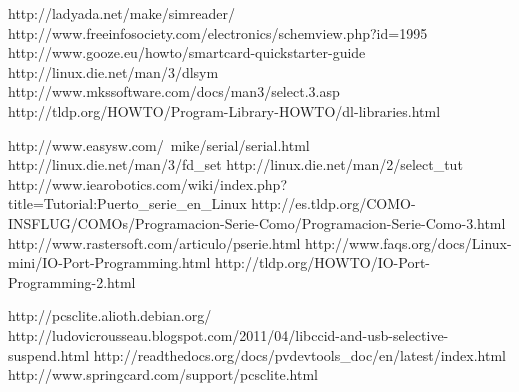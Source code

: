 \begin{thebibliography}{200}
\bibitem{} http://ladyada.net/make/simreader/
\bibitem{} http://www.freeinfosociety.com/electronics/schemview.php?id=1995
\bibitem{} http://www.gooze.eu/howto/smartcard-quickstarter-guide
\bibitem{} http://linux.die.net/man/3/dlsym
\bibitem{} http://www.mkssoftware.com/docs/man3/select.3.asp
\bibitem{} http://tldp.org/HOWTO/Program-Library-HOWTO/dl-libraries.html

\bibitem{} http://www.easysw.com/~mike/serial/serial.html
\bibitem{} http://linux.die.net/man/3/fd\_set
\bibitem{} http://linux.die.net/man/2/select\_tut
\bibitem{} http://www.iearobotics.com/wiki/index.php?title=Tutorial:Puerto\_serie\_en\_Linux
\bibitem{} http://es.tldp.org/COMO-INSFLUG/COMOs/Programacion-Serie-Como/Programacion-Serie-Como-3.html
\bibitem{} http://www.rastersoft.com/articulo/pserie.html
\bibitem{} http://www.faqs.org/docs/Linux-mini/IO-Port-Programming.html
\bibitem{} http://tldp.org/HOWTO/IO-Port-Programming-2.html

 http://pcsclite.alioth.debian.org/
\bibitem{} http://ludovicrousseau.blogspot.com/2011/04/libccid-and-usb-selective-suspend.html
\bibitem{} http://readthedocs.org/docs/pvdevtools\_doc/en/latest/index.html
\bibitem{} http://www.springcard.com/support/pcsclite.html



\end{thebibliography}
